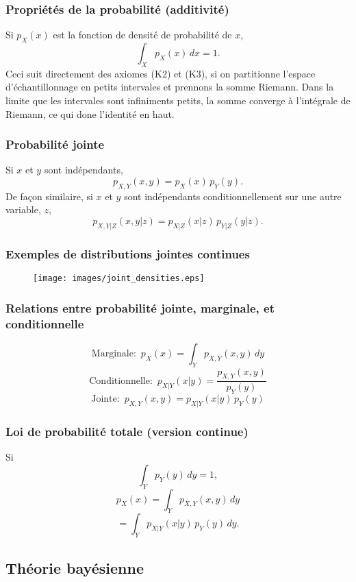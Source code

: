 \documentclass{beamer}
\begin{document}
\begin{frame}
    \frametitle{Propriétés de la probabilité (additivité)}
    Si $p_X(x)$ est la fonction de densité de probabilité de $x$,
    \[\int_X p_X(x) \, dx = 1.\]
    \vfill
    \pause
    Ceci suit directement des axiomes (K2) et (K3), si on partitionne l'espace d'échantillonnage
    en petits intervales et prennons la somme Riemann. Dans la limite que les intervales sont infiniments
    petits, la somme converge à l'intégrale de Riemann, ce qui done l'identité en haut.
\end{frame}


\begin{frame}
    \frametitle{Probabilité jointe}
    Si $x$ et $y$ sont indépendants,
    \[p_{X,Y}(x,y) = p_X(x) \, p_Y(y).\]
    \pause
    De façon similaire, si $x$ et $y$ sont indépendants
    conditionnellement sur une autre variable, $z$,
    \[p_{X,Y|Z}(x,y|z) = p_{X|Z}(x|z) \, p_{Y|Z}(y|z).\]
\end{frame}


\begin{frame}
    \frametitle{Exemples de distributions jointes continues}
    \begin{figure}
      \centering
      \texttt{[image: images/joint\_densities.eps]}
    \end{figure}
\end{frame}


\begin{frame}
    \frametitle{Relations entre probabilité jointe, marginale, et conditionnelle}
    \[\textrm{Marginale:} \, \, \, p_X(x) = \int_Y p_{X,Y}(x,y) \, dy\]
    \pause
    \[\textrm{Conditionnelle:} \, \, \, p_{X|Y}(x|y) = \frac{p_{X,Y}(x,y)}{p_Y(y)}\]
    \pause
    \[\textrm{Jointe:} \, \, \, p_{X,Y}(x,y) = p_{X|Y}(x|y) \, p_Y(y)\]
\end{frame}


\begin{frame}
    \frametitle{Loi de probabilité totale (version continue)}
    Si
    \[\int_Y p_Y(y) \, dy = 1,\]
    \pause
    \[p_X(x) = \int_{Y} p_{X,Y}(x, y) \, dy\]
    \pause
    \[= \int_{Y} p_{X|Y}(x | y) \, p_Y(y) \, dy.\]
\end{frame}



\subsection{Théorie bayésienne}
\end{document}
